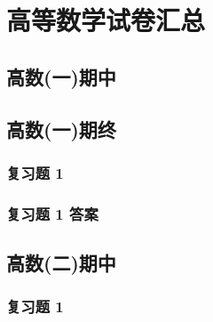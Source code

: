 \chapter{高等数学试卷汇总}

\section{高数(一)期中}





\section{高数(一)期终}
\subsection{复习题 1}
\subsection{复习题 1 答案}




\section{高数(二)期中}
\subsection{复习题 1}%

